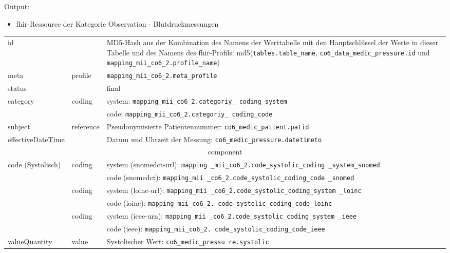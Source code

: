 Output:
\begin{itemize}
	\item \ac{fhir}-Ressource der Kategorie \glqq Observation\grqq{} - Blutdruckmessungen
\end{itemize}
\clearpage
\begin{longtable}{|l|l|p{7cm}|} 
	\hline
	\rowcolor{lightgray} \multicolumn{3}{|l|}{Data Mapping (inhaltlich) - Blutdruckmessungen} \\ \hline
	id &  & MD5-Hash aus der Kombination des Namens der Werttabelle mit den Hauptschlüssel der Werte in dieser Tabelle und des Namens des \ac{fhir}-Profils: md5(\texttt{tables.table\_name}, \texttt{co6\_data\_medic\_pressure.id} und \texttt{mapping\_mii\_co6\_2.profile\_name}) \\ \hline
	meta & profile & \texttt{mapping\_mii\_co6\_2.meta\_profile} \\ \hline 
	status &  & final  \\ \hline 
	category & coding & system: \texttt{mapping\_mii\_co6\_2.categoriy\_ coding\_system} \\ 
	\cline{3-3}
	& & code: \texttt{mapping\_mii\_co6\_2.categoriy\_ coding\_code} \\ \hline
	subject & reference & Pseudonymisierte Patientennummer: \texttt{co6\_medic\_patient.patid} \\ \hline	
	effectiveDateTime & & Datum und Uhrzeit der Messung:  \texttt{co6\_medic\_pressure.datetimeto} \\ \hline
	\multicolumn{3}{|c|}{component} \\ \hline
	code (Systolisch) & coding & system (\ac{snomedct}-\acs{url}): \texttt{mapping \_mii\_co6\_2.code\_systolic\_coding \_system\_snomed} \\ 
	\cline{3-3} 
	&  & code (\ac{snomedct}): \texttt{mapping\_mii \_co6\_2.code\_systolic\_coding\_code \_snomed} \\
	\cline{2-3} 
	&  coding & system (\ac{loinc}-\ac{url}): \texttt{mapping\_mii \_co6\_2.code\_systolic\_coding\_system \_loinc} \\ 
	\cline{3-3} 
	&  & code (\ac{loinc}): \texttt{mapping\_mii\_co6\_2. code\_systolic\_coding\_code\_loinc} \\ 
	\cline{2-3} 
	&  coding & system (\ac{ieee}-\acs{urn}): \texttt{mapping\_mii \_co6\_2.code\_systolic\_coding\_system \_ieee} \\ 
	\cline{3-3} 
	&  & code (\ac{ieee}): \texttt{mapping\_mii\_co6\_2. code\_systolic\_coding\_code\_ieee} \\ \hline
	valueQuantity & value & Systolischer Wert: \texttt{co6\_medic\_pressu re.systolic} \\

\end{longtable}

